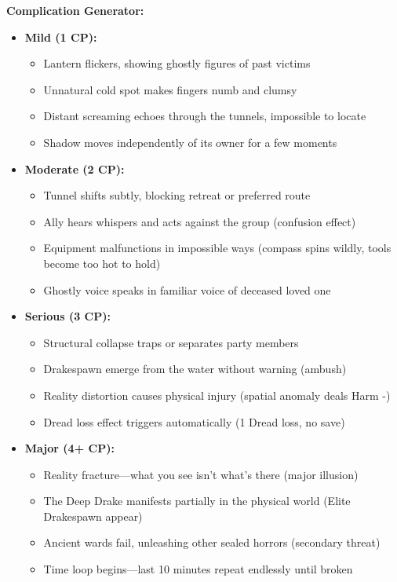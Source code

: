 \documentclass[11pt]{article}
\begin{document}
\textbf{Complication Generator:}
\begin{itemize}
\item \textbf{Mild (1 CP):} 
  \begin{itemize}
  \item Lantern flickers, showing ghostly figures of past victims
  \item Unnatural cold spot makes fingers numb and clumsy
  \item Distant screaming echoes through the tunnels, impossible to locate
  \item Shadow moves independently of its owner for a few moments
  \end{itemize}
\item \textbf{Moderate (2 CP):}
  \begin{itemize}
  \item Tunnel shifts subtly, blocking retreat or preferred route
  \item Ally hears whispers and acts against the group (confusion effect)
  \item Equipment malfunctions in impossible ways (compass spins wildly, tools become too hot to hold)
  \item Ghostly voice speaks in familiar voice of deceased loved one
  \end{itemize}
\item \textbf{Serious (3 CP):}
  \begin{itemize}
  \item Structural collapse traps or separates party members
  \item Drakespawn emerge from the water without warning (ambush)
  \item Reality distortion causes physical injury (spatial anomaly deals Harm -)
  \item Dread loss effect triggers automatically (1 Dread loss, no save)
  \end{itemize}
\item \textbf{Major (4+ CP):}
  \begin{itemize}
  \item Reality fracture—what you see isn't what's there (major illusion)
  \item The Deep Drake manifests partially in the physical world (Elite Drakespawn appear)
  \item Ancient wards fail, unleashing other sealed horrors (secondary threat)
  \item Time loop begins—last 10 minutes repeat endlessly until broken
  \end{itemize}
\end{itemize}
\end{document}
